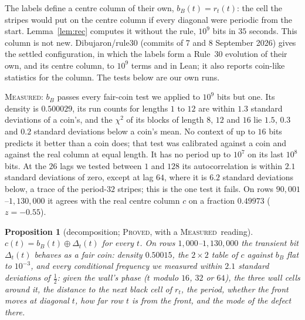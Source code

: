 \documentclass[11pt]{article}
\newtheorem{proposition}[theorem]{Proposition}
\theoremstyle{definition}
\theoremstyle{remark}
\newcommand{\PROVED}{\textsc{Proved}}
\newcommand{\MEASURED}{\textsc{Measured}}
\begin{document}
The labels define a centre column of their own, $b_B(t)=r_t(t)$: the cell the stripes would put on the centre column if every diagonal were periodic from the start. Lemma~\ref{lem:rec} computes it without the rule, $10^9$ bits in $35$ seconds. This column is not new. Dibujaron/rule30 \cite{Dib2} (commits of 7 and 8 September 2026) gives the settled configuration, in which the labels form a Rule~30 evolution of their own, and its centre column, to $10^9$ terms and in Lean; it also reports coin-like statistics for the column. The tests below are our own runs.

\MEASURED: $b_B$ passes every fair-coin test we applied to $10^9$ bits but one. Its density is $0.500029$, its run counts for lengths $1$ to $12$ are within $1.3$ standard deviations of a coin's, and the $\chi^2$ of its blocks of length $8$, $12$ and $16$ lie $1.5$, $0.3$ and $0.2$ standard deviations below a coin's mean. No context of up to $16$ bits predicts it better than a coin does; that test was calibrated against a coin and against the real column at equal length. It has no period up to $10^7$ on its last $10^8$ bits. At the $26$ lags we tested between $1$ and $128$ its autocorrelation is within $2.1$ standard deviations of zero, except at lag $64$, where it is $6.2$ standard deviations below, a trace of the period-$32$ stripes; this is the one test it fails. On rows $90{,}001$--$1{,}130{,}000$ it agrees with the real centre column $c$ on a fraction $0.49973$ ($z=-0.55$).

\begin{proposition}[decomposition; \PROVED, with a \MEASURED\ reading]
$c(t)=b_B(t)\oplus\Delta_t(t)$ for every $t$. On rows $1{,}000$--$1{,}130{,}000$ the transient bit $\Delta_t(t)$ behaves as a fair coin: density $0.50015$, the $2\times2$ table of $c$ against $b_B$ flat to $10^{-3}$, and every conditional frequency we measured within $2.1$ standard deviations of $\tfrac12$: given the wall's phase ($t$ modulo $16$, $32$ or $64$), the three wall cells around it, the distance to the next black cell of $r_t$, the period, whether the front moves at diagonal $t$, how far row $t$ is from the front, and the mode of the defect there.
\end{proposition}
\end{document}
